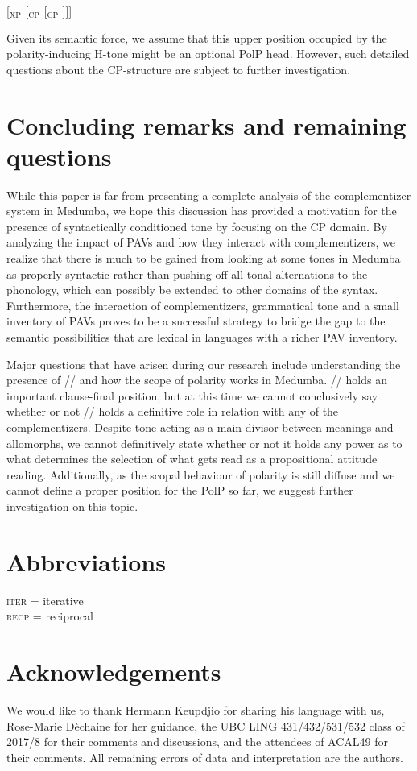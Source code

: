 \documentclass[output=paper,colorlinks,citecolor=brown]{langscibook}
\begin{document}
\ea \label{struc2}
    {[$_{\text{XP}}$  [$_{\text{CP}}$ \text{ {\mbuL} } [$_{\text{CP}}$ ]]]}
\z

Given its semantic force, we assume that this upper position occupied by the polarity-inducing H-tone might be an optional PolP head. However, such detailed questions about the CP-structure are subject to further investigation.

\section{Concluding remarks and remaining questions}

While this paper is far from presenting a complete analysis of the complementizer system in Medumba, we hope this discussion has provided a motivation for the presence of syntactically conditioned tone by focusing on the CP domain. By analyzing the impact of PAVs and how they interact with  complementizers, we realize that there is much to be gained from looking at some tones in Medumba as properly syntactic rather than pushing off all tonal alternations to the phonology, which can possibly be extended to other domains of the syntax. Furthermore, the interaction of complementizers, grammatical tone and a small inventory of PAVs proves to be a successful strategy to bridge the gap to the semantic possibilities that are lexical in languages with a richer PAV inventory.

Major questions that have arisen during our research include understanding the presence of /\la/ and how the scope of polarity works in Medumba. /\la/ holds an important clause-final position, but at this time we cannot conclusively say whether or not /\la/ holds a definitive role in relation with any of the complementizers. Despite tone acting as a main divisor between meanings and allomorphs, we cannot definitively state whether or not it holds any power as to what determines the selection of what gets read as a propositional attitude reading. Additionally, as the scopal behaviour of polarity is still diffuse and we cannot define a proper position for the PolP so far, we suggest further investigation on this topic.

\section*{Abbreviations}

\textsc{iter} = iterative \\
\textsc{recp} = reciprocal

\section*{Acknowledgements}

We would like to thank Hermann Keupdjio for sharing his language with us, Rose-Marie Dèchaine for her guidance, the UBC LING 431/432/531/532 class of 2017/8 for their comments and discussions, and the attendees of ACAL49 for their comments. All remaining errors of data and interpretation are the authors.

\printbibliography[heading=subbibliography,notkeyword=this]
\end{document}

